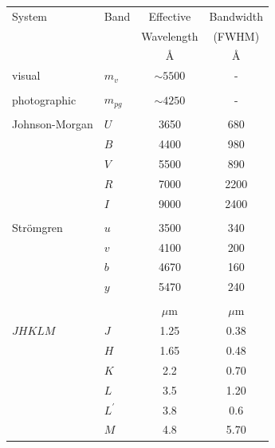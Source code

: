 \documentclass[twoside,11pt]{article}
\begin{document}
\begin{description}
  \begin{table}[htbp]

  \begin{center}
  \begin{tabular}{llcc}
   System         & Band     & Effective  & Bandwidth \\
                  &          & Wavelength & (FWHM)    \\ \hline
                  &          & \AA        & \AA    \\
   visual         & $m_{v}$  & $\sim5500$ &  -     \\
                  &          &            &        \\
   photographic   & $m_{pg}$ & $\sim4250$ & -      \\
                  &          &            &        \\
   Johnson-Morgan & $U$      & 3650       & 680    \\
                  & $B$      & 4400       & 980    \\
                  & $V$      & 5500       & 890    \\
                  & $R$      & 7000       & 2200   \\
                  & $I$      & 9000       & 2400   \\
                  &          &            &        \\
   Str\"{o}mgren  & $u$      & 3500       & 340    \\
                  & $v$      & 4100       & 200    \\
                  & $b$      & 4670       & 160    \\
                  & $y$      & 5470       & 240    \\
                  &          &            &        \\
                  &              & $\mu$m & $\mu$m \\
   $JHKLM$        & $J$          & 1.25   & 0.38   \\
                  & $H$          & 1.65   & 0.48   \\
                  & $K$          & 2.2    & 0.70   \\
                  & $L$          & 3.5    & 1.20   \\
                  & $L^{\prime}$ & 3.8    & 0.6    \\
                  & $M$          & 4.8    & 5.70   \\
  \end{tabular}
  \end{center}


\end{table}
\end{description}
\end{document}
